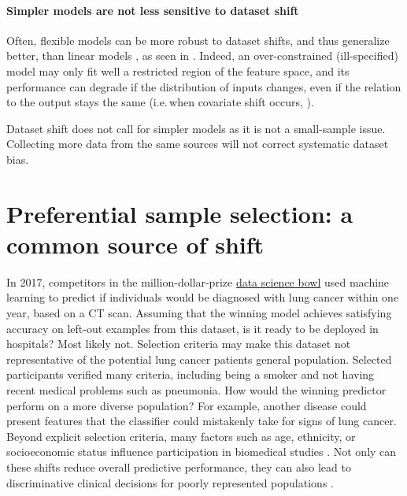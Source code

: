 \documentclass[a4paper,num-refs]{oup-contemporary}
\newcommand{\ie}{i.e.\,}
\begin{document}
\paragraph{Simpler models are not less sensitive to dataset shift}
Often, flexible models can be more robust to dataset
shifts, and thus generalize better, than linear models
\citep{storkey2009training}, as seen in
. Indeed, an over-constrained (ill-specified) model may
only fit well a restricted region of the feature space, and its performance can
degrade if the distribution of inputs changes, even if the relation to the
output stays the same (\ie when covariate shift occurs, ).

Dataset shift does not call for simpler models as it is not a small-sample
issue. Collecting more data from the same sources will not correct systematic dataset bias.


\section{Preferential sample selection: a common source of shift}
\label{sec:preferential-sample-selection}
%
%
In 2017, competitors in the million-dollar-prize
\href{https://www.kaggle.com/c/data-science-bowl-2017/overview}{data science
  bowl} used machine learning to predict if individuals would be diagnosed with
lung cancer within one year, based on a CT scan.
%
Assuming that the winning model achieves satisfying accuracy on left-out
examples from this dataset, is it ready to be deployed in hospitals? Most likely
not.
%
Selection criteria may 
make this dataset not
representative of the potential lung cancer patients general population.
%
Selected participants verified many criteria, including being a smoker and not
having recent medical problems such as pneumonia. How would the winning
predictor perform on a more diverse population? For example, another disease
could present features that the classifier could mistakenly take for signs of lung
cancer.
%
Beyond explicit selection criteria, many factors such as age, ethnicity, or
socioeconomic status influence participation in biomedical studies
\citep{henrich2010most,murthy2004participation,heiat2002representation,chastain2020racial}.
%
Not only can these shifts reduce overall predictive performance, they can also
lead to discriminative clinical decisions for poorly represented populations
\citep{oakden2020hidden,gianfrancesco2018potential,barocas-hardt-narayanan,abbasi2020risk,cirillo2020sex}.
%
\end{document}
